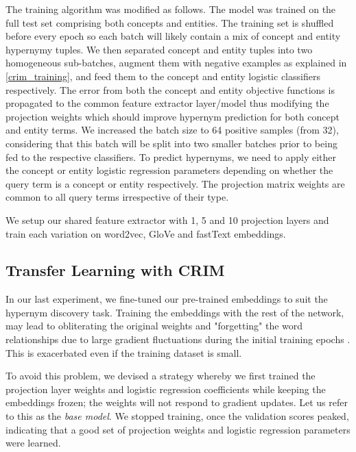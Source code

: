 The training algorithm was modified as follows.  The model was trained on the full test set comprising both concepts and entities.  The training set is shuffled before every epoch so each batch will likely contain a mix of concept and entity hypernymy tuples.  We then separated concept and entity tuples into two homogeneous sub-batches, augment them with negative examples as explained in \cref{crim_training}, and feed them to the concept and entity logistic classifiers respectively.  The error from both the concept and entity objective functions is propagated to the common feature extractor layer/model thus modifying the projection weights which should improve hypernym prediction for both concept and entity terms.  We increased the batch size to 64 positive samples (from 32), considering that this batch will be split into two smaller batches prior to being fed to the respective classifiers.  To predict hypernyms, we need to apply either the concept or entity logistic regression parameters depending on whether the query term is a concept or entity respectively.  The projection matrix weights are common to all query terms irrespective of their type.

We setup our shared feature extractor with 1, 5 and 10 projection layers and train each variation on word2vec, GloVe and fastText embeddings.

\subsection{Transfer Learning with CRIM}
In our last experiment, we fine-tuned our pre-trained embeddings to suit the hypernym discovery task.  Training the embeddings with the rest of the network, may lead to obliterating the original weights and "forgetting" the word relationships due to large gradient fluctuations during the initial training epochs \citep{howard2018universal}.  This is exacerbated even if the training dataset is small.

To avoid this problem, we devised a strategy whereby we first trained the projection layer weights and logistic regression coefficients while keeping the embeddings frozen; the weights will not respond to gradient updates.  Let us refer to this as the \textit{base model}.  We stopped training, once the validation scores peaked, indicating that a good set of projection weights and logistic regression parameters were learned.  

